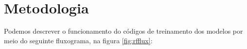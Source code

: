 



\section{Metodologia}



Podemos descrever o funcionamento do códigos de treinamento dos modelos por meio do seguinte fluxograma, na figura \ref{fig:rfflux}:

